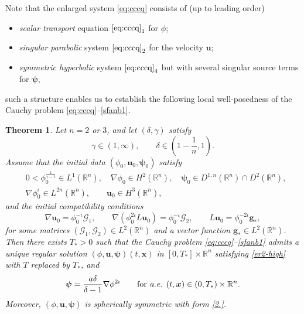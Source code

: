 \documentclass[11pt,reqno]{amsart}
\newtheorem{thm}{Theorem}[section]
\numberwithin{rk}{section}
\numberwithin{prop}{section}
\numberwithin{mydef}{section}
\numberwithin{lem}{section}
\numberwithin{equation}{section}
\numberwithin{thm}{section}
\begin{document}
Note that  the enlarged system \eqref{eq:cccq}   consists of (up to leading order) 
\begin{itemize}
\item {\it scalar transport} equation $\eqref{eq:cccq}_1$ for $\phi$;
\smallskip
\item {\it singular parabolic}  system  $\eqref{eq:cccq}_2$ for the velocity $\boldsymbol{u}$;
\smallskip
\item {\it symmetric hyperbolic} system  $\eqref{eq:cccq}_4$ but with several singular source terms for $\boldsymbol{\psi}$,
\end{itemize}
such a structure enables us to  establish  the following local well-posedness  of the Cauchy problem \eqref{eq:cccq}{\rm--}\eqref{sfanb1}.


\begin{thm}\label{th1}
Let $n=2$ or $3$, and let $(\delta,\gamma)$ satisfy
\begin{equation}\label{canshu}
\gamma\in (1,\infty),\qquad\delta\in (1-\frac{1}{n},1).    
\end{equation}
Assume that  the initial data $(\phi_0, \boldsymbol{u}_0,\boldsymbol{\psi}_0)$ satisfy 
\begin{equation}\label{th78qq}
\begin{aligned}
&0<\phi_0^\frac{1}{\gamma-1}\in L^1(\mathbb{R}^n),\quad \nabla\phi_0\in H^2 (\mathbb{R}^n),\quad \boldsymbol{\psi}_0 \in  D^{1,n}(\mathbb{R}^n)\cap  D^2(\mathbb{R}^n),\\
&\nabla\phi_0^\iota\in L^{2n}(\mathbb{R}^n),\qquad \boldsymbol{u}_0\in H^3(\mathbb{R}^n),
\end{aligned}
\end{equation}
and the initial  compatibility conditions
\begin{equation}\label{th78zxq}
\nabla \boldsymbol{u}_0=\phi^{-\iota}_0 \mathcal{G}_1,\qquad
\nabla (\phi^{2\iota}_0L\boldsymbol{u}_0)=\phi^{-\iota}_0\mathcal{G}_2,\qquad  L\boldsymbol{u}_0= \phi^{-2\iota}_0\boldsymbol{g}_*,
\end{equation}
for some matrices $(\mathcal{G}_1,\mathcal{G}_2) \in L^2(\mathbb{R}^n)$ and a vector function  $\boldsymbol{g}_*\in L^2(\mathbb{R}^n)$. Then there exists $T_*>0$ such that the Cauchy problem \eqref{eq:cccq}{\rm--}\eqref{sfanb1} admits a unique regular solution $(\phi, \boldsymbol{u},\boldsymbol{\psi})(t,\boldsymbol{x})$  in $[0,T_*]\times \mathbb{R}^n$  satisfying \eqref{er2-high} with $T$ replaced by $T_*$, and
\begin{equation}
\boldsymbol{\psi}=\frac{a\delta}{\delta-1}\nabla \phi^{2\iota} \qquad\text{for \textit{a.e.} $(t,\boldsymbol{x})\in (0,T_*)\times \mathbb{R}^n$}.
\end{equation}
Moreover, $(\phi, \boldsymbol{u},\boldsymbol{\psi})$ is spherically symmetric with form \eqref{2.}.
\end{thm}
\end{document}

